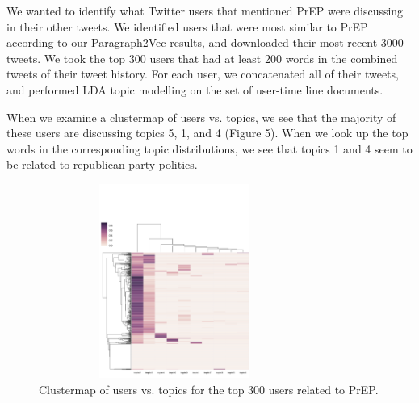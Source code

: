 \documentclass{sig-alternate-05-2015}
\begin{document}

We wanted to identify what Twitter users that mentioned PrEP were discussing in their other tweets. We identified users that were most similar to PrEP according to our Paragraph2Vec results, and downloaded their most recent 3000 tweets. We took the top 300 users that had at least 200 words in the combined tweets of their tweet history. For each user, we concatenated all of their tweets, and performed LDA topic modelling on the set of user-time line documents.

When we examine a clustermap of users vs. topics, we see that the majority of these users are discussing topics 5, 1, and 4 (Figure 5). When we look up the top words in the corresponding topic distributions, we see that topics 1 and 4 seem to be related to republican party politics.

\begin{figure}
\centering
\includegraphics[height=2.5in, width=3.5in]{user_timeline_clustermap}
\caption{Clustermap of users vs. topics for the top 300 users related to PrEP.}
\end{figure}
\end{document}
